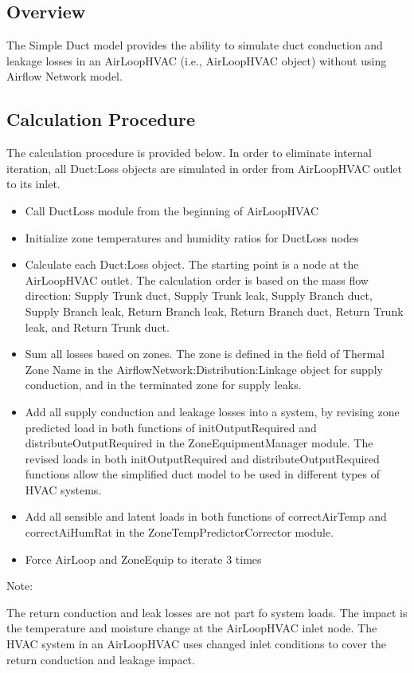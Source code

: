 \subsection{Overview}\label{simple-duct-model-overview}

The Simple Duct model provides the ability to simulate duct conduction and leakage losses in an AirLoopHVAC (i.e., AirLoopHVAC object) without using Airflow Network model.

\subsection{Calculation Procedure}\label{simple-duct-model-calculation-procedure}

The calculation procedure is provided below. In order to eliminate internal iteration, all Duct:Loss objects are simulated in order from AirLoopHVAC outlet to its inlet.

\begin{itemize}
\item
  Call DuctLoss module from the beginning of AirLoopHVAC
\item
  Initialize zone temperatures and humidity ratios for DuctLoss nodes
\item
  Calculate each Duct:Loss object. The starting point is a node at the AirLoopHVAC outlet. The calculation order is based on the mass flow direction: Supply Trunk duct, Supply Trunk leak, Supply Branch duct, Supply Branch leak, Return Branch leak, Return Branch duct, Return Trunk leak, and Return Trunk duct.
\item
  Sum all losses based on zones. The zone is defined in the field of Thermal Zone Name in the AirflowNetwork:Distribution:Linkage object for supply conduction, and in the terminated zone for supply leaks.
\item
  Add all supply conduction and leakage losses into a system, by revising zone predicted load in both functions of initOutputRequired and distributeOutputRequired in the ZoneEquipmentManager module. The revised loads in both initOutputRequired and distributeOutputRequired functions allow the simplified duct model to be used in different types of HVAC systems.
\item
  Add all sensible and latent loads in both functions of correctAirTemp and correctAiHumRat in the ZoneTempPredictorCorrector module.
\item
  Force AirLoop and ZoneEquip to iterate 3 times
\end{itemize}

Note:

The return conduction and leak losses are not part fo system loads. The impact is the temperature and moisture change at the AirLoopHVAC inlet node. The HVAC system in an AirLoopHVAC uses changed inlet conditions to cover the return conduction and leakage impact.


